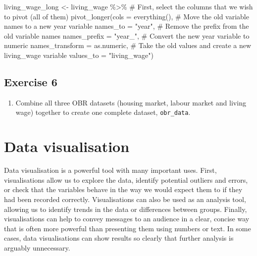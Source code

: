 \documentclass[
  letterpaper,
  DIV=11,
  numbers=noendperiod]{scrreprt}
\newenvironment{Shaded}{\begin{snugshade}}{\end{snugshade}}
\newcommand{\AttributeTok}[1]{\textcolor[rgb]{0.40,0.45,0.13}{#1}}
\newcommand{\CommentTok}[1]{\textcolor[rgb]{0.37,0.37,0.37}{#1}}
\newcommand{\FunctionTok}[1]{\textcolor[rgb]{0.28,0.35,0.67}{#1}}
\newcommand{\NormalTok}[1]{\textcolor[rgb]{0.00,0.23,0.31}{#1}}
\newcommand{\OtherTok}[1]{\textcolor[rgb]{0.00,0.23,0.31}{#1}}
\newcommand{\SpecialCharTok}[1]{\textcolor[rgb]{0.37,0.37,0.37}{#1}}
\newcommand{\StringTok}[1]{\textcolor[rgb]{0.13,0.47,0.30}{#1}}
\providecommand{\tightlist}{%
  \setlength{\itemsep}{0pt}\setlength{\parskip}{0pt}}\usepackage{longtable,booktabs,array}
\begin{document}
\begin{Shaded}
\begin{Highlighting}[]
\NormalTok{living\_wage\_long }\OtherTok{\textless{}{-}}\NormalTok{ living\_wage }\SpecialCharTok{\%\textgreater{}\%} 
  \CommentTok{\# First, select the columns that we wish to pivot (all of them)}
  \FunctionTok{pivot\_longer}\NormalTok{(}\AttributeTok{cols =} \FunctionTok{everything}\NormalTok{(),}
               \CommentTok{\# Move the old variable names to a new year variable}
               \AttributeTok{names\_to =} \StringTok{"year"}\NormalTok{,}
               \CommentTok{\# Remove the prefix from the old variable names}
               \AttributeTok{names\_prefix =} \StringTok{"year\_"}\NormalTok{,}
               \CommentTok{\# Convert the new year variable to numeric}
               \AttributeTok{names\_transform =}\NormalTok{ as.numeric,}
               \CommentTok{\# Take the old values and create a new living\_wage variable}
               \AttributeTok{values\_to =} \StringTok{"living\_wage"}\NormalTok{)}
\end{Highlighting}
\end{Shaded}

\section{Exercise 6}\label{exercise-6}

\begin{enumerate}
\def\labelenumi{\arabic{enumi}.}
\tightlist
\item
  Combine all three OBR datasets (housing market, labour market and
  living wage) together to create one complete dataset,
  \texttt{obr\_data}.
\end{enumerate}


\chapter{Data visualisation}\label{data-visualisation}

Data visualisation is a powerful tool with many important uses. First,
visualisations allow us to explore the data, identify potential outliers
and errors, or check that the variables behave in the way we would
expect them to if they had been recorded correctly. Visualisations can
also be used as an analysis tool, allowing us to identify trends in the
data or differences between groups. Finally, visualisations can help to
convey messages to an audience in a clear, concise way that is often
more powerful than presenting them using numbers or text. In some cases,
data visualisations can show results so clearly that further analysis is
arguably unnecessary.
\end{document}

